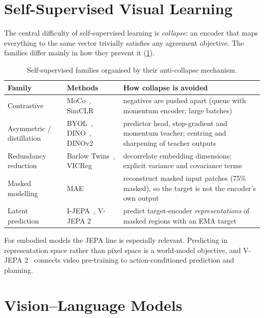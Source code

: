 \documentclass[11pt]{article}
\begin{document}
\section{Self-Supervised Visual Learning}

The central difficulty of self-supervised learning is \emph{collapse}: an encoder that maps
everything to the same vector trivially satisfies any agreement objective. The families
differ mainly in how they prevent it (\cref{tab:ssl}).

\begin{table}[t]
\centering
\caption{Self-supervised families organised by their anti-collapse mechanism.}
\label{tab:ssl}
\small
\begin{tabular}{p{2.8cm}p{4.2cm}p{6.6cm}}
\toprule
Family & Methods & How collapse is avoided \\
\midrule
Contrastive & MoCo~\cite{he2020moco}, SimCLR~\cite{chen2020simclr} & negatives are pushed apart (queue with momentum encoder; large batches) \\
Asymmetric / distillation & BYOL~\cite{grill2020byol}, DINO~\cite{caron2021dino}, DINOv2~\cite{oquab2023dinov2} & predictor head, stop-gradient and momentum teacher; centring and sharpening of teacher outputs \\
Redundancy reduction & Barlow Twins~\cite{zbontar2021barlow}, VICReg~\cite{bardes2022vicreg} & decorrelate embedding dimensions; explicit variance and covariance terms \\
Masked modelling & MAE~\cite{he2022mae} & reconstruct masked input patches (75\% masked), so the target is not the encoder's own output \\
Latent prediction & I-JEPA~\cite{assran2023ijepa}, V-JEPA 2~\cite{assran2025vjepa2} & predict target-encoder \emph{representations} of masked regions with an EMA target \\
\bottomrule
\end{tabular}
\end{table}

For embodied models the JEPA line is especially relevant. Predicting in representation
space rather than pixel space is a world-model objective, and V-JEPA 2~\cite{assran2025vjepa2}
connects video pre-training to action-conditioned prediction and planning.

\section{Vision--Language Models}
\end{document}
